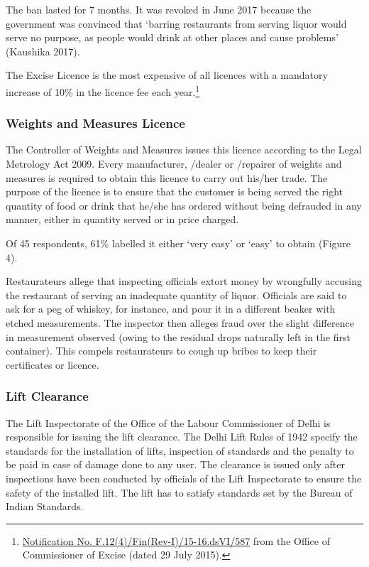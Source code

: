 \documentclass[a4paper, 12pt]{article}
\begin{document}
		The ban lasted for 7 months. It was revoked in June 2017 because the government was convinced that ‘barring restaurants from serving liquor would serve no purpose, as people would drink at other places and cause problems’ (Kaushika 2017).
		
		The Excise Licence is the most expensive of all licences with a mandatory increase of 10\% in the licence fee each year.\footnote{\href{https://bit.ly/2xoejoG}{Notification No. F.12(4)/Fin(Rev-I)/15-16.dsVI/587} from the Office of Commissioner of Excise 
(dated 29 July 2015).} 
		
		
		\subsubsection{Weights and Measures Licence}
		The Controller of Weights and Measures issues this licence according to the Legal Metrology Act 2009. Every manufacturer, /dealer or /repairer of weights and measures is required to obtain this licence to carry out his/her trade. The purpose of the 
licence is to ensure that the customer is being served the right quantity of food or drink that he/she has ordered without being defrauded in any manner, either in quantity served or in price charged.
		
		Of 45 respondents, 61\% labelled it either ‘very easy’ or ‘easy’ to obtain (Figure 4). %
		
		Restaurateurs allege that inspecting officials extort money by wrongfully accusing the restaurant of serving an inadequate quantity of liquor. Officials are said to ask for a peg of whiskey, for instance, and pour it in a different beaker with etched 
measurements. The inspector then alleges fraud over the slight difference in measurement observed (owing to the residual drops naturally left in the first container). This compels restaurateurs to cough up bribes to keep their certificates or licence.
		
	
	
		\subsubsection{Lift Clearance}
		The Lift Inspectorate of the Office of the Labour Commissioner of Delhi is responsible for issuing the lift clearance. The Delhi Lift Rules of 1942 specify the standards for the installation of lifts, inspection of standards and the penalty to be paid in case of 
damage done to any user. The clearance is issued only after inspections have been conducted by officials of the Lift Inspectorate to ensure the safety of the installed lift. The lift has to satisfy standards set by the Bureau of Indian Standards.
		
\end{document}

